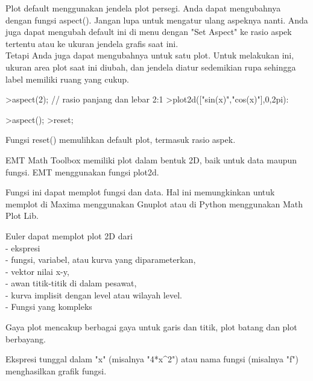 \documentclass[a4paper,10pt]{article}
\begin{document}
\begin{eulernotebook}
\begin{eulercomment}
\begin{eulercomment}
\begin{eulercomment}
\end{eulercomment}
\begin{eulercomment}
Plot default menggunakan jendela plot persegi. Anda dapat mengubahnya
dengan fungsi aspect(). Jangan lupa untuk mengatur ulang aspeknya
nanti. Anda juga dapat mengubah default ini di menu dengan "Set
Aspect" ke rasio aspek tertentu atau ke ukuran jendela grafis saat
ini. \\
Tetapi Anda juga dapat mengubahnya untuk satu plot. Untuk melakukan
ini, ukuran area plot saat ini diubah, dan jendela diatur sedemikian
rupa sehingga label memiliki ruang yang cukup.
\end{eulercomment}
\begin{eulerprompt}
>aspect(2); // rasio panjang dan lebar 2:1
>plot2d(["sin(x)","cos(x)"],0,2pi):
\end{eulerprompt}
\begin{eulerprompt}
>aspect();
>reset;
\end{eulerprompt}
\begin{eulercomment}
Fungsi reset() memulihkan default plot, termasuk rasio aspek.

\end{eulercomment}
\begin{eulercomment}
EMT Math Toolbox memiliki plot dalam bentuk 2D, baik untuk data maupun
fungsi. EMT menggunakan fungsi plot2d.

Fungsi ini dapat memplot fungsi dan data. Hal ini memungkinkan untuk
memplot di Maxima menggunakan Gnuplot atau di Python menggunakan Math
Plot Lib.

Euler dapat memplot plot 2D dari\\
- ekspresi\\
- fungsi, variabel, atau kurva yang diparameterkan,\\
- vektor nilai x-y,\\
- awan titik-titik di dalam pesawat,\\
- kurva implisit dengan level atau wilayah level.\\
- Fungsi yang kompleks

Gaya plot mencakup berbagai gaya untuk garis dan titik, plot batang
dan plot berbayang.

\end{eulercomment}
\begin{eulercomment}
Ekspresi tunggal dalam "x" (misalnya "4*x\textasciicircum{}2") atau nama fungsi
(misalnya "f") menghasilkan grafik fungsi. 


\end{eulercomment}
\end{eulercomment}
\end{eulercomment}
\end{eulernotebook}
\end{document}
